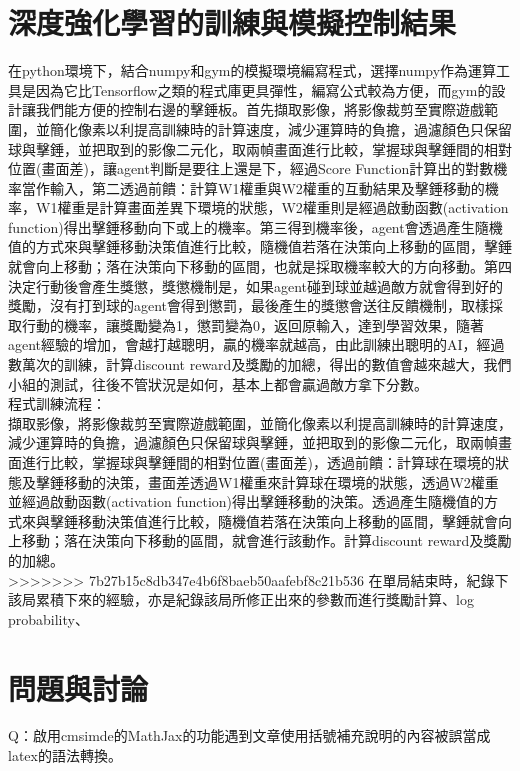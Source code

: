 \documentclass[14pt,a4paper]{report}  %
\begin{document}
\chapter{深度強化學習的訓練與模擬控制結果}
\qquad 在python環境下，結合numpy和gym的模擬環境編寫程式，選擇numpy作為運算工具是因為它比Tensorflow之類的程式庫更具彈性，編寫公式較為方便，而gym的設計讓我們能方便的控制右邊的擊錘板。首先擷取影像，將影像裁剪至實際遊戲範圍，並簡化像素以利提高訓練時的計算速度，減少運算時的負擔，過濾顏色只保留球與擊錘，並把取到的影像二元化，取兩幀畫面進行比較，掌握球與擊錘間的相對位置(畫面差)，讓agent判斷是要往上還是下，經過Score Function計算出的對數機率當作輸入，第二透過前饋：計算W1權重與W2權重的互動結果及擊錘移動的機率，W1權重是計算畫面差異下環境的狀態，W2權重則是經過啟動函數(activation function)得出擊錘移動向下或上的機率。第三得到機率後，agent會透過產生隨機值的方式來與擊錘移動決策值進行比較，隨機值若落在決策向上移動的區間，擊錘就會向上移動；落在決策向下移動的區間，也就是採取機率較大的方向移動。第四決定行動後會產生獎懲，獎懲機制是，如果agent碰到球並越過敵方就會得到好的獎勵，沒有打到球的agent會得到懲罰，最後產生的獎懲會送往反饋機制，取樣採取行動的機率，讓獎勵變為1，懲罰變為0，返回原輸入，達到學習效果，隨著agent經驗的增加，會越打越聰明，贏的機率就越高，由此訓練出聰明的AI，經過數萬次的訓練，計算discount reward及獎勵的加總，得出的數值會越來越大，我們小組的測試，往後不管狀況是如何，基本上都會贏過敵方拿下分數。\\[12pt]

程式訓練流程：\\
\qquad 擷取影像，將影像裁剪至實際遊戲範圍，並簡化像素以利提高訓練時的計算速度，減少運算時的負擔，過濾顏色只保留球與擊錘，並把取到的影像二元化，取兩幀畫面進行比較，掌握球與擊錘間的相對位置(畫面差)，透過前饋：計算球在環境的狀態及擊錘移動的決策，畫面差透過W1權重來計算球在環境的狀態，透過W2權重並經過啟動函數(activation function)得出擊錘移動的決策。透過產生隨機值的方式來與擊錘移動決策值進行比較，隨機值若落在決策向上移動的區間，擊錘就會向上移動；落在決策向下移動的區間，就會進行該動作。計算discount reward及獎勵的加總。\\

>>>>>>> 7b27b15c8db347e4b6f8baeb50aafebf8c21b536
\qquad 在單局結束時，紀錄下該局累積下來的經驗，亦是紀錄該局所修正出來的參數而進行獎勵計算、log probability、\\

\newpage
\chapter{問題與討論}
Q：啟用cmsimde的MathJax的功能遇到文章使用括號補充說明的內容被誤當成latex的語法轉換。\\
\end{document}
